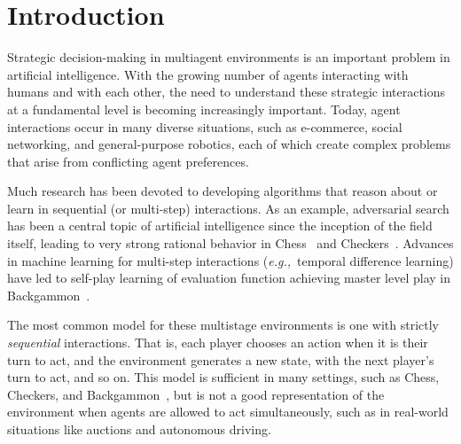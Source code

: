\documentclass[preprint,12pt]{elsarticle}
\newcommand{\eg}{{\it e.g.,}~}
\begin{document}

\section{Introduction}
\label{sec:intro}

Strategic decision-making in multiagent environments is an important problem in artificial intelligence. 
With the growing number of agents interacting with humans and with each other, the need to 
understand these strategic interactions at a fundamental level is becoming increasingly important. 
Today, agent interactions occur in many diverse situations, such as e-commerce, social networking, and 
general-purpose robotics, each of which create complex problems that arise from conflicting agent 
preferences. 

Much research has been devoted to developing algorithms that reason about or learn in sequential (or multi-step) 
interactions. As an example, adversarial search has been a central topic of artificial intelligence 
since the inception of the field itself, leading to very strong rational behavior in 
Chess~\cite{Campbell02deepblue} and Checkers~\cite{Schaeffer96chinook}. Advances in machine learning for multi-step interactions 
(\eg temporal difference learning) have led to self-play learning of evaluation function achieving master level play 
in Backgammon~\cite{Tesauro95TDGammon}. 

The most common model for these multistage environments is one with strictly {\it sequential} 
interactions. That is, each player chooses an action when it is their turn to act, and the environment 
generates a new state, with the next player's turn to act, and so on. This model is sufficient in many 
settings, such as Chess, Checkers, and Backgammon~\cite{AIbook}, but is not a good representation of the 
environment when agents are allowed to act simultaneously, such as in real-world situations like auctions and 
autonomous driving. 
\end{document}
